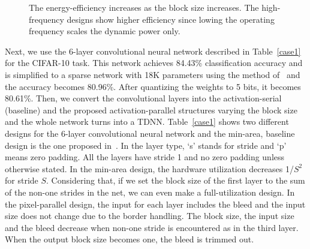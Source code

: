 \documentclass[journal]{IEEEtran}
\begin{document}
\begin{figure}
\centering
\begin{subfigure}{.22\textwidth}
  \centering
  \caption{}
	\end{subfigure}
\begin{subfigure}{.22\textwidth}
  \centering
  \caption{}
\end{subfigure} 
\caption{The energy-efficiency increases as the block size increases. The high-frequency designs show higher efficiency since lowing the operating frequency scales the dynamic power only.  }\label{cifar}
\end{figure}

Next, we use the 6-layer convolutional neural network described in Table~\ref{case1} for the CIFAR-10 task. This network achieves 84.43\% classification accuracy and is simplified to a sparse network with 18K parameters using the method of~\cite{chung2016simplifying} and the accuracy becomes 80.96\%. After quantizing the weights to 5 bits, it becomes 80.61\%. Then, we convert the convolutional layers into the activation-serial (baseline) and the proposed activation-parallel structures varying the block size and the whole network turns into a TDNN.
Table~\ref{case1} shows two different designs for the 6-layer convolutional neural network and the min-area, baseline design is the one proposed in~\cite{chung2015insight}. In the layer type, `s' stands for stride and `p' means zero padding. All the layers have stride 1 and no zero padding unless otherwise stated. In the min-area design, the hardware utilization decreases 1/$S^2$ for stride $S$. Considering that, if we set the block size of the first layer to the sum of the non-one strides in the net, we can even make a full-utilization design. In the pixel-parallel design, the input for each layer includes the bleed and the input size does not change due to the border handling. The block size, the input size and the bleed decrease when non-one stride is encountered as in the third layer. When the output block size becomes one, the bleed is trimmed out. 
\end{document}
